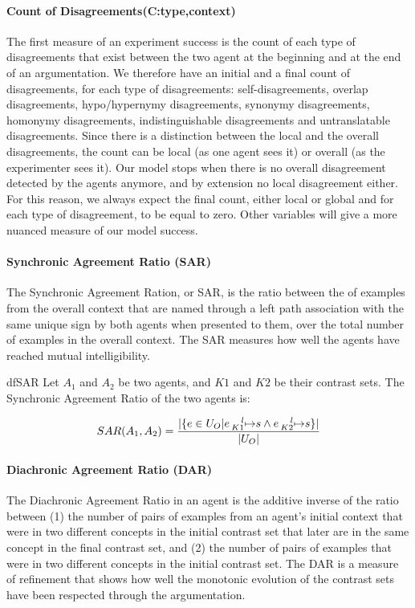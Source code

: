 \paragraph{Count of Disagreements(C:type,context)} The first measure of an experiment success is the count of each type of disagreements that exist between the two agent at the beginning and at the end of an argumentation. We therefore have an initial and a final count of disagreements, for each type of disagreements: self-disagreements, overlap disagreements, hypo/hypernymy disagreements, synonymy disagreements, homonymy disagreements, indistinguishable disagreements and untranslatable disagreements. Since there is a distinction between the local and the overall disagreements, the count can be local (as one agent sees it) or overall (as the experimenter sees it). Our model stops when there is no overall disagreement detected by the agents anymore, and by extension no local disagreement either. For this reason, we always expect the final count, either local or global and for each type of disagreement, to be equal to zero. Other variables will give a more nuanced measure of our model success.

\paragraph{Synchronic Agreement Ratio (SAR)} The Synchronic Agreement Ration, or SAR, is the ratio between the of examples from the overall context that are named through a left path association with the same unique sign by both agents when presented to them, over the total number of examples in the overall context. The SAR measures how well the agents have reached mutual intelligibility. %

\begin{restatable}[SAR]{df}{SAR}
\label{def:SAR}
Let $A_{1}$ and $A_{2}$ be two agents, and $K1$ and $K2$ be their contrast sets. The Synchronic Agreement Ratio of the two agents is:

\[
SAR(A_{1},A_{2}) = \frac{|\{ e \in U_{O} | e \prescript{l}{K1}{\mapsto} s \wedge  e \prescript{l}{K2}{\mapsto} s \}|}{|U_{O}|} 
\]

\end{restatable}

\paragraph{Diachronic Agreement Ratio (DAR)} The Diachronic Agreement Ratio in an agent is the additive inverse of the ratio between (1) the number of pairs of examples from an agent's initial context that were in two different concepts in the initial contrast set that later are in the same concept in the final contrast set, and (2) the number of pairs of examples that were in two different concepts in the initial contrast set. The DAR is a measure of refinement that shows how well the monotonic evolution of the contrast sets have been respected through the argumentation. %

